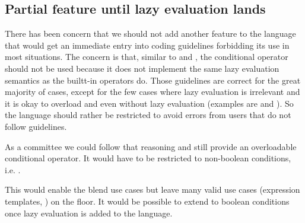 \subsection{Partial feature until lazy evaluation lands}
There has been concern that we should not add another feature to the language that would get an immediate entry into coding guidelines forbidding its use in most situations.
The concern is that, similar to  and , the conditional operator should not be used because it does not implement the same lazy evaluation semantics as the builtt-in operators do.
Those guidelines are correct for the great majority of cases, except for the few cases where lazy evaluation is irrelevant and it is okay to overload \code{\&\&} and \code{||} even without lazy evaluation (examples are  and ).
So the language should rather be restricted to avoid errors from users that do not follow guidelines.

As a committee we could follow that reasoning and still provide an overloadable conditional operator.
It would have to be restricted to non-boolean conditions, i.e. .

This would enable the blend use cases but leave many valid use cases (expression templates, ) on the floor.
It would be possible to extend  to boolean conditions once lazy evaluation is added to the language.

